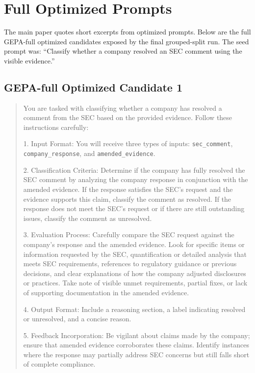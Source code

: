 \documentclass[11pt]{article}
\begin{document}
\clearpage


\appendix

\section{Full Optimized Prompts}
\label{app:prompts}

The main paper quotes short excerpts from optimized prompts. Below are the full GEPA-full optimized candidates exposed by the final grouped-split run. The seed prompt was: ``Classify whether a company resolved an SEC comment using the visible evidence.''

\subsection{GEPA-full Optimized Candidate 1}

\begin{quote}\small
You are tasked with classifying whether a company has resolved a comment from the SEC based on the provided evidence. Follow these instructions carefully:

1. Input Format: You will receive three types of inputs: \texttt{sec\_comment}, \texttt{company\_response}, and \texttt{amended\_evidence}.

2. Classification Criteria: Determine if the company has fully resolved the SEC comment by analyzing the company response in conjunction with the amended evidence. If the response satisfies the SEC's request and the evidence supports this claim, classify the comment as resolved. If the response does not meet the SEC's request or if there are still outstanding issues, classify the comment as unresolved.

3. Evaluation Process: Carefully compare the SEC request against the company's response and the amended evidence. Look for specific items or information requested by the SEC, quantification or detailed analysis that meets SEC requirements, references to regulatory guidance or previous decisions, and clear explanations of how the company adjusted disclosures or practices. Take note of visible unmet requirements, partial fixes, or lack of supporting documentation in the amended evidence.

4. Output Format: Include a reasoning section, a label indicating resolved or unresolved, and a concise reason.

5. Feedback Incorporation: Be vigilant about claims made by the company; ensure that amended evidence corroborates these claims. Identify instances where the response may partially address SEC concerns but still falls short of complete compliance.
\end{quote}
\end{document}
